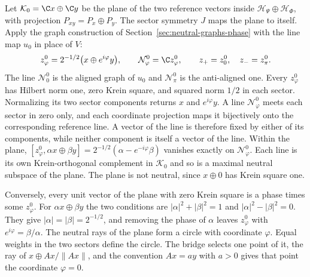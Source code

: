 Let $\mathcal K_0=\C x\oplus\C y$ be the plane of the two reference vectors inside $\mathcal H_\Psi\oplus\mathcal H_\Phi$, with projection $P_{xy}=P_x\oplus P_y$. The sector symmetry $J$ maps the plane to itself. Apply the graph construction of Section~\ref{sec:neutral-graphs-phase} with the line map $u_0$ in place of $V$:
\begin{equation}
 z^0_\varphi=2^{-1/2}\bigl(x\oplus e^{i\varphi}y\bigr),\qquad
 \mathcal N^0_\varphi=\C z^0_\varphi,\qquad z_+=z^0_0,\quad z_-=z^0_\pi .
 \label{eq:ground-plane-vectors}
\end{equation}
The line $\mathcal N^0_0$ is the aligned graph of $u_0$ and $\mathcal N^0_\pi$ is the anti-aligned one. Every $z^0_\varphi$ has Hilbert norm one, zero Krein square, and squared norm $1/2$ in each sector. Normalizing its two sector components returns $x$ and $e^{i\varphi}y$. A line $\mathcal N^0_\varphi$ meets each sector in zero only, and each coordinate projection maps it bijectively onto the corresponding reference line. A vector of the line is therefore fixed by either of its components, while neither component is itself a vector of the line. Within the plane, $[z^0_\varphi,\alpha x\oplus\beta y]=2^{-1/2}(\alpha-e^{-i\varphi}\beta)$ vanishes exactly on $\mathcal N^0_\varphi$. Each line is its own Krein-orthogonal complement in $\mathcal K_0$ and so is a maximal neutral subspace of the plane. The plane is not neutral, since $x\oplus0$ has Krein square one.

Conversely, every unit vector of the plane with zero Krein square is a phase times some $z^0_\varphi$. For $\alpha x\oplus\beta y$ the two conditions are $|\alpha|^2+|\beta|^2=1$ and $|\alpha|^2-|\beta|^2=0$. They give $|\alpha|=|\beta|=2^{-1/2}$, and removing the phase of $\alpha$ leaves $z^0_\varphi$ with $e^{i\varphi}=\beta/\alpha$. The neutral rays of the plane form a circle with coordinate $\varphi$. Equal weights in the two sectors define the circle. The bridge selects one point of it, the ray of $x\oplus Ax/\|Ax\|$, and the convention $Ax=ay$ with $a>0$ gives that point the coordinate $\varphi=0$.

